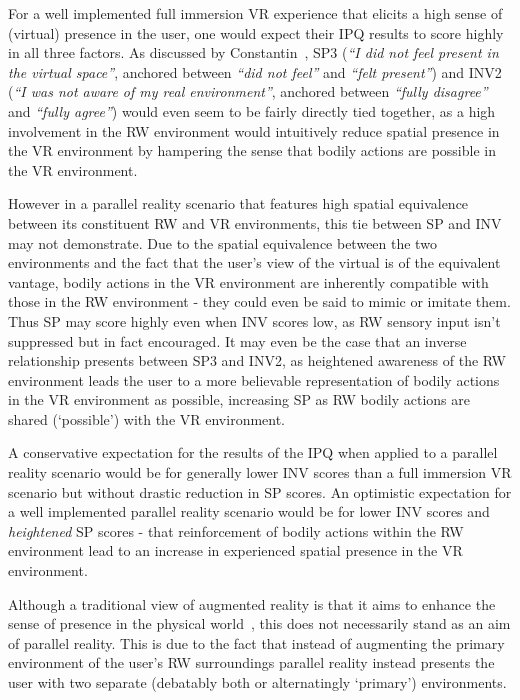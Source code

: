 For a well implemented full immersion VR experience that elicits a high sense of (virtual) presence in the user, one would expect their IPQ results to score highly in all three factors. As discussed by Constantin~\cite{Constantin2003}, SP3 (\textit{``I did not feel present in the virtual space''}, anchored between \textit{``did not feel''} and \textit{``felt present''}) and INV2 (\textit{``I was not aware of my real environment''}, anchored between \textit{``fully disagree''} and \textit{``fully agree''}) would even seem to be fairly directly tied together, as a high involvement in the RW environment would intuitively reduce spatial presence in the VR environment by hampering the sense that bodily actions are possible in the VR environment.

However in a parallel reality scenario that features high spatial equivalence between its constituent RW and VR environments, this tie between SP and INV may not demonstrate. Due to the spatial equivalence between the two environments and the fact that the user's view of the virtual is of the equivalent vantage, bodily actions in the VR environment are inherently compatible with those in the RW environment - they could even be said to mimic or imitate them. Thus SP may score highly even when INV scores low, as RW sensory input isn't suppressed but in fact encouraged. It may even be the case that an inverse relationship presents between SP3 and INV2, as heightened awareness of the RW environment leads the user to a more believable representation of bodily actions in the VR environment as possible, increasing SP as RW bodily actions are shared (`possible') with the VR environment.

A conservative expectation for the results of the IPQ when applied to a parallel reality scenario would be for generally lower INV scores than a full immersion VR scenario but without drastic reduction in SP scores. An optimistic expectation for a well implemented parallel reality scenario would be for lower INV scores and \textit{heightened} SP scores - that reinforcement of bodily actions within the RW environment lead to an increase in experienced spatial presence in the VR environment.

Although a traditional view of augmented reality is that it aims to enhance the sense of presence in the physical world~\cite{Waterworth2014}, this does not necessarily stand as an aim of parallel reality. This is due to the fact that instead of augmenting the primary environment of the user's RW surroundings parallel reality instead presents the user with two separate (debatably both or alternatingly `primary') environments.

